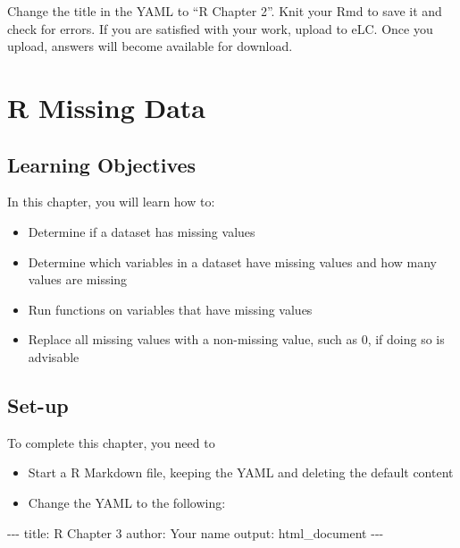 \documentclass[
]{book}
\makeatletter
\newenvironment{Shaded}{\begin{snugshade}}{\end{snugshade}}
\newcommand{\NormalTok}[1]{#1}
\newcommand{\SpecialCharTok}[1]{\textcolor[rgb]{0,0,0}{#1}}
\newcommand{\StringTok}[1]{\textcolor[rgb]{0.5,0.5,0.5}{#1}}
\providecommand{\tightlist}{%
  \setlength{\itemsep}{0pt}\setlength{\parskip}{0pt}}
\newenvironment{kframe}{%
\medskip{}
\setlength{\fboxsep}{.8em}
 \def\at@end@of@kframe{}%
 \ifinner\ifhmode%
  \def\at@end@of@kframe{\end{minipage}}%
  \begin{minipage}{\columnwidth}%
 \fi\fi%
 \def\FrameCommand##1{\hskip\@totalleftmargin \hskip-\fboxsep
 \colorbox{shadecolor}{##1}\hskip-\fboxsep
     \hskip-\linewidth \hskip-\@totalleftmargin \hskip\columnwidth}%
 \MakeFramed {\advance\hsize-\width
   \@totalleftmargin\z@ \linewidth\hsize
   \@setminipage}}%
 {\par\unskip\endMakeFramed%
 \at@end@of@kframe}
\renewenvironment{Shaded}{\begin{kframe}}{\end{kframe}}
\makeatother
\begin{document}
Change the title in the YAML to ``R Chapter 2''. Knit your Rmd to save it and check for errors. If you are satisfied with your work, upload to eLC. Once you upload, answers will become available for download.

\hypertarget{r-missing-data}{%
\chapter{R Missing Data}\label{r-missing-data}}

\hypertarget{learning-objectives}{%
\section{Learning Objectives}\label{learning-objectives}}

In this chapter, you will learn how to:

\begin{itemize}
\tightlist
\item
  Determine if a dataset has missing values
\item
  Determine which variables in a dataset have missing values and how many values are missing
\item
  Run functions on variables that have missing values
\item
  Replace all missing values with a non-missing value, such as 0, if doing so is advisable
\end{itemize}

\hypertarget{set-up}{%
\section{Set-up}\label{set-up}}

To complete this chapter, you need to

\begin{itemize}
\item
  Start a R Markdown file, keeping the YAML and deleting the default content
\item
  Change the YAML to the following:
\end{itemize}

\begin{Shaded}
\begin{Highlighting}[]
\SpecialCharTok{{-}{-}{-}}
\NormalTok{title}\SpecialCharTok{:} \StringTok{\textquotesingle{}R Chapter 3\textquotesingle{}}
\NormalTok{author}\SpecialCharTok{:} \StringTok{\textquotesingle{}Your name\textquotesingle{}}
\NormalTok{output}\SpecialCharTok{:}\NormalTok{ html\_document}
\SpecialCharTok{{-}{-}{-}}
\end{Highlighting}
\end{Shaded}
\end{document}
